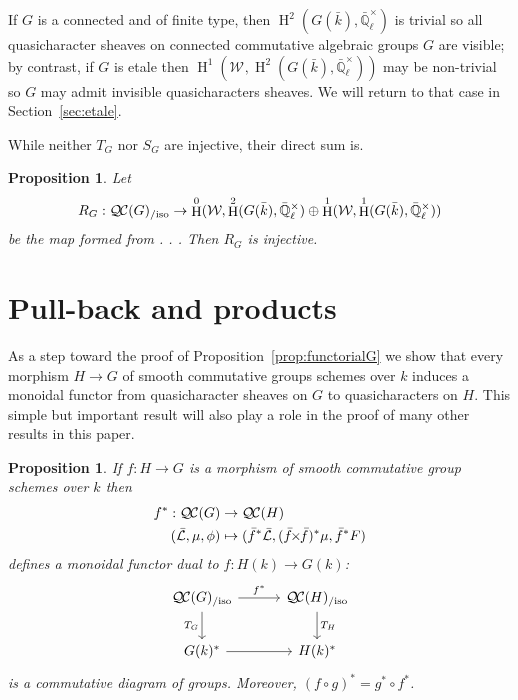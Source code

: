 \documentclass{amsart}
\theoremstyle{plain}
\newtheorem{proposition}[theorem]{Proposition}
\theoremstyle{definition}
\theoremstyle{remark}
\newcommand{\EE}{\mathbb{\bar Q}_\ell}
\newcommand{\bFq}{\bar{k}}
\newcommand{\Fq}{k}
\newcommand{\EEx}{\EE^\times}
\newcommand{\Weil}[1]{\mathcal{W}_{#1}}
\DeclareMathOperator{\Hh}{H}
\newcommand{\gqcs}[1]{{\mathcal{\bar #1}}}
\newcommand{\QC}{{\mathcal{Q\hskip-0.8pt C}}}
\newcommand{\QCiso}[1]{\QC(#1)_{/\text{iso}}}
\newcommand{\TrFrob}[1]{T_{#1}}
\renewcommand{\bf}{\bar{f}}
\newcommand{\tight}[3]{\hspace{-#1pt}{#2}\hspace{-#3pt}}
\newcommand{\bfxf}{\text{$\bar{f} \tight{1}{\times}{1} \bar{f}$}}
\begin{document}
If $G$ is a connected and of finite type, then $\Hh^2(G(\bFq),\EEx)$ is trivial
so all quasicharacter sheaves on connected commutative algebraic groups $G$ are visible;
 by contrast, if $G$ is etale then $\Hh^1(\Weil{},\Hh^2(G(\bFq),\EEx))$ may be non-trivial so $G$ may admit invisible quasicharacters sheaves.
We will return to that case in Section~\ref{sec:etale}.

While neither $T_{G}$ nor $S_{G}$ are injective, their direct sum is.

\begin{proposition}
Let
\[
R_{G} : \QCiso{G} \to  \Hh^0(\Weil{},\Hh^2(G(\bFq),\EEx) \oplus \Hh^1(\Weil{}, \Hh^1(G(\bFq),\EEx))
\]
be the map formed from  . . .
Then $R_{G}$ is injective.
\end{proposition}




\section{Pull-back and products}\label{sec:pullback}

As a step toward the proof of Proposition~\ref{prop:functorialG} we show that every
morphism  $H \to G$ of smooth commutative groups schemes over $\Fq$ induces a monoidal functor from quasicharacter
sheaves on $G$ to quasicharacters on $H$. This simple but important result will also
play a role in the proof of many other results in this paper.

\begin{proposition}\label{prop:pullback}
  If $f : H\to G$ is a morphism of smooth commutative group schemes over $\Fq$ then
  \begin{align*}
  f^* : \QC(G) &\to \QC(H) \\
  (\gqcs{L},\mu,\phi) &\mapsto (\bf^*\gqcs{L},(\bfxf)^*\mu,\bf^*F)
  \end{align*}
  defines a monoidal functor dual to $f \colon H(\Fq) \to G(\Fq)$:
  \[
  \begin{tikzcd}[row sep=20, column sep=30]
   \QCiso{G} \rar{f^*} \arrow[swap]{d}{\TrFrob{G}} & \QCiso{H} \dar{\TrFrob{H}} \\
   G(\Fq)^* \rar & H(\Fq)^*
  \end{tikzcd}
  \]
  is a commutative diagram of groups.  Moreover, $(f\circ g)^* = g^* \circ f^*$.
\end{proposition}
\end{document}
